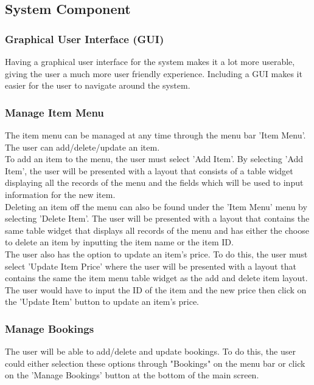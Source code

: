 \subsection{System Component}

\subsubsection{Graphical User Interface (GUI)}
Having a graphical user interface for the system makes it a lot more userable, giving the user a much more user friendly experience. Including a GUI makes it easier for the user to navigate around the system.

\subsubsection{Manage Item Menu}
The item menu can be managed at any time through the menu bar 'Item Menu'. The user can add/delete/update an item. \\

To add an item to the menu, the user must select 'Add Item'. By selecting 'Add Item', the user will be presented with a layout that consists of a table widget displaying all the records of the menu and the fields which will be used to input information for the new item. \\

Deleting an item off the menu can also be found under the 'Item Menu' menu by selecting 'Delete Item'. The user will be presented with a layout that contains the same table widget that displays all records of the menu and has either the choose to delete an item by inputting the item name or the item ID. \\

The user also has the option to update an item's price. To do this, the user must select 'Update Item Price' where the user will be presented with a layout that contains the same the item menu table widget as the add and delete item layout. The user would have to input the ID of the item and the new price then click on the 'Update Item' button to update an item's price.


\subsubsection{Manage Bookings}

The user will be able to add/delete and update bookings. To do this, the user could either selection these options through "Bookings" on the menu bar or click on the 'Manage Bookings' button at the bottom of the main screen. \\

